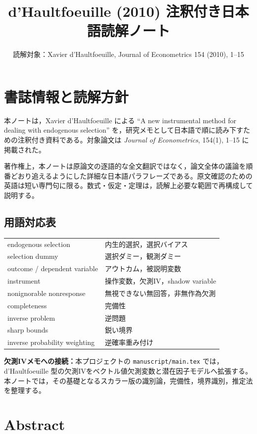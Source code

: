 \documentclass[10pt,a4paper]{article}
\title{d'Haultfoeuille (2010) 注釈付き日本語読解ノート}
\author{読解対象：Xavier d'Haultfoeuille, Journal of Econometrics 154 (2010), 1--15}
\date{}
\newcommand{\connect}[1]{\par\smallskip\noindent\textbf{欠測IVメモへの接続：}#1\par\smallskip}
\begin{document}
\maketitle

\section*{書誌情報と読解方針}

本ノートは，Xavier d'Haultfoeuille による ``A new instrumental method for dealing with endogenous selection'' を，研究メモとして日本語で順に読み下すための注釈付き資料である。対象論文は \textit{Journal of Econometrics}, 154(1), 1--15 に掲載された。

著作権上，本ノートは原論文の逐語的な全文翻訳ではなく，論文全体の議論を順番どおり追えるようにした詳細な日本語パラフレーズである。原文確認のための英語は短い専門句に限る。数式・仮定・定理は，読解上必要な範囲で再構成して説明する。

\subsection*{用語対応表}

\begin{center}
\begin{tabular}{ll}
endogenous selection & 内生的選択，選択バイアス \\
selection dummy & 選択ダミー，観測ダミー \\
outcome / dependent variable & アウトカム，被説明変数 \\
instrument & 操作変数，欠測IV，shadow variable \\
nonignorable nonresponse & 無視できない無回答，非無作為欠測 \\
completeness & 完備性 \\
inverse problem & 逆問題 \\
sharp bounds & 鋭い境界 \\
inverse probability weighting & 逆確率重み付け \\
\end{tabular}
\end{center}

\connect{本プロジェクトの \texttt{manuscript/main.tex} では，d'Haultfoeuille 型の欠測IVをベクトル値欠測変数と潜在因子モデルへ拡張する。本ノートでは，その基礎となるスカラー版の識別論，完備性，境界識別，推定法を整理する。}

\section{Abstract}
\end{document}
